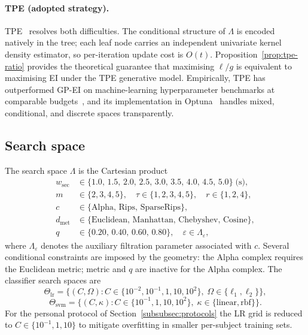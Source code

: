 \paragraph{TPE (adopted strategy).}
TPE~\parencite{bergstra2011algorithms} resolves both difficulties. The conditional structure of
$\Lambda$ is encoded natively in the tree; each leaf node carries an independent
univariate kernel density estimator, so per-iteration update cost is $O(t)$.
Proposition~\ref{prop:tpe-ratio} provides the theoretical guarantee that maximising
$\ell/g$ is equivalent to maximising EI under the TPE generative model. Empirically,
TPE has outperformed GP-EI on machine-learning hyperparameter benchmarks at comparable
budgets~\parencite{bergstra2011algorithms,bergstra2012random}, and its implementation in
Optuna~\parencite{optuna} handles mixed, conditional, and discrete spaces transparently.

\subsection{Search space}
\label{subsubsec:bayes-search-space}

The search space $\Lambda$ is the Cartesian product
\begin{align*}
  w_{\mathrm{sec}}&\in\{1.0,\,1.5,\,2.0,\,2.5,\,3.0,\,3.5,\,4.0,\,4.5,\,5.0\}\;\text{(s)},\\
  m&\in\{2,3,4,5\},\quad \tau\in\{1,2,3,4,5\},\quad r\in\{1,2,4\},\\
  c&\in\{\mathrm{Alpha},\,\mathrm{Rips},\,\mathrm{SparseRips}\},\\
  d_{\mathrm{met}}&\in\{\text{Euclidean, Manhattan, Chebyshev, Cosine}\},\\
  q&\in\{0.20,\,0.40,\,0.60,\,0.80\},\quad \varepsilon\in\Lambda_\varepsilon,
\end{align*}
where $\Lambda_\varepsilon$ denotes the auxiliary filtration parameter associated with $c$. Several conditional constraints are imposed by the geometry: the Alpha complex requires the Euclidean metric; metric and $q$ are inactive for the Alpha complex. The classifier search spaces are
\[
  \Theta_{\mathrm{lr}}=\bigl\{(C,\Omega):C\in\{10^{-2},10^{-1},1,10,10^2\},\;\Omega\in\{\ell_1,\ell_2\}\bigr\},
\]
\[
  \Theta_{\mathrm{svm}}=\bigl\{(C,\kappa):C\in\{10^{-1},1,10,10^2\},\;\kappa\in\{\mathrm{linear},\mathrm{rbf}\}\bigr\}.
\]
For the personal protocol of Section~\ref{subsubsec:protocols} the LR grid is reduced to $C\in\{10^{-1},1,10\}$ to mitigate overfitting in smaller per-subject training sets.

